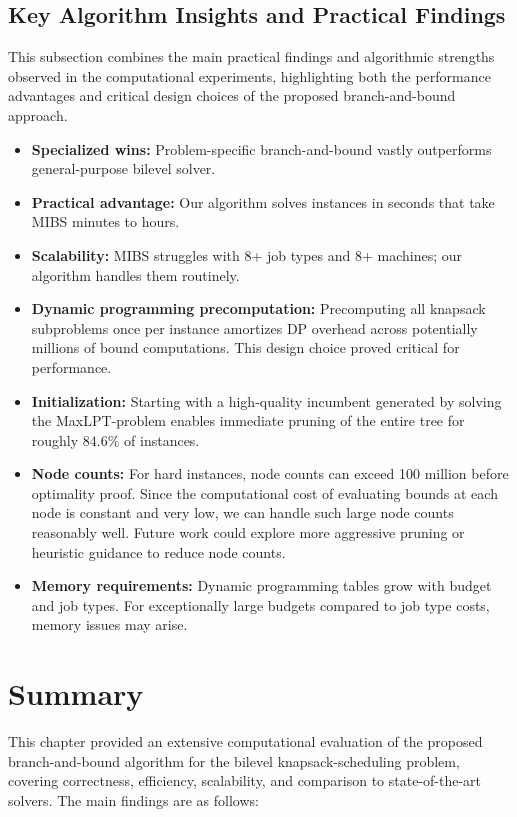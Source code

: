 \subsection{Key Algorithm Insights and Practical Findings}

This subsection combines the main practical findings and algorithmic strengths observed in the computational experiments, highlighting both the performance advantages and critical design choices of the proposed branch-and-bound approach.

\begin{itemize}
    \item \textbf{Specialized wins:} Problem-specific branch-and-bound vastly outperforms general-purpose bilevel solver.
    \item \textbf{Practical advantage:} Our algorithm solves instances in seconds that take MIBS minutes to hours.
    \item \textbf{Scalability:} MIBS struggles with 8+ job types and 8+ machines; our algorithm handles them routinely.
    \item \textbf{Dynamic programming precomputation:} Precomputing all knapsack subproblems once per instance amortizes DP overhead across potentially millions of bound computations. This design choice proved critical for performance.
    \item \textbf{Initialization:} Starting with a high-quality incumbent generated by solving the MaxLPT-problem enables immediate pruning of the entire tree for roughly $84.6\%$ of instances.
    \item \textbf{Node counts:} For hard instances, node counts can exceed 100 million before optimality proof. Since the computational cost of evaluating bounds at each node is constant and very low, we can handle such large node counts reasonably well. Future work could explore more aggressive pruning or heuristic guidance to reduce node counts.
    \item \textbf{Memory requirements:} Dynamic programming tables grow with budget and job types. For exceptionally large budgets compared to job type costs, memory issues may arise.
\end{itemize}


\section{Summary}

This chapter provided an extensive computational evaluation of the proposed branch-and-bound algorithm for the bilevel knapsack-scheduling problem, covering correctness, efficiency, scalability, and comparison to state-of-the-art solvers. The main findings are as follows:

